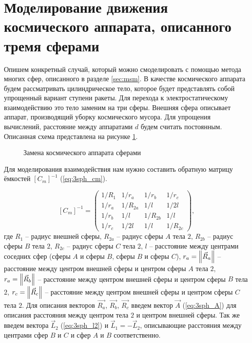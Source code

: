 \section{Моделирование движения космического аппарата, описанного тремя сферами}
\label{sec:3sph}

Опишем конкретный случай, который можно смоделировать с помощью метода многих сфер, описанного в разделе \ref{sec:msm}.
В качестве космического аппарата будем рассматривать цилиндрическое тело, которое будет представлять собой упрощенный вариант ступени ракеты.
Для перехода к электростатическому взаимодействию это тело заменим на три сферы.
Внешняя сфера описывает аппарат, производящий уборку космического мусора.
Для упрощения вычислений, расстояние между аппаратами $d$ будем считать постоянным.
Описанная схема представлена на рисунке \ref{ris:3sph}.

\begin{figure}[H]
	\caption{Замена космического аппарата сферами}
	\label{ris:3sph}
\end{figure}

Для моделирования взаимодействия нам нужно составить обратную матрицу ёмкостей $[C_m]^{-1}$ (\ref{eq:3sph_cm}).

\begin{equation}
\label{eq:3sph_cm}
	[C_m]^{-1} = 
	\begin{pmatrix}
		1/R_1	&	1/r_a	&	1/r_b	&	1/r_c\\
		1/r_a	&	1/R_{2a}	&	1/l		&	1/2l\\
		1/r_b	&	1/l		&	1/R_{2b}	&	1/l\\
		1/r_c	&	1/2l		&	1/l		&	1/R_{2c}
	\end{pmatrix},
\end{equation}
где $R_1$ – радиус внешней сферы, $R_{2a}$ – радиус сферы $A$ тела $2$, $R_{2b}$ – радиус сферы $B$ тела $2$, $R_{2c}$ – радиус сферы $C$ тела $2$, $l$ – расстояние между центрами соседних сфер (сферы $A$ и сферы $B$, сферы $B$ и сферы $C$), $r_a = \left\lVert\vec{R}_a\right\rVert$ – расстояние между центром внешней сферы и центром сферы $A$ тела $2$, $r_a = \left\lVert\vec{R}_b\right\rVert$ – расстояние между центром внешней сферы и центром сферы $B$ тела $2$, $r_c = \left\lVert\vec{R}_c\right\rVert$ – расстояние между центром внешней сферы и центром сферы $C$ тела $2$.
Для описания векторов $\vec{R_a}$, $\vec{R_b}$, $\vec{R_c}$ введем вектор $\vec{A}$ (\ref{eq:3sph_A}) для описания расстояния между центром тела $2$ и центром внешней сферы.
Так же введем вектора $\vec{L}_2$ (\ref{eq:3sph_l2}) и $\vec{L}_1 = -\vec{L}_2$, описывающие расстояния между центрами сфер $B$ и $C$ и сфер $A$ и $B$ соответственно.

